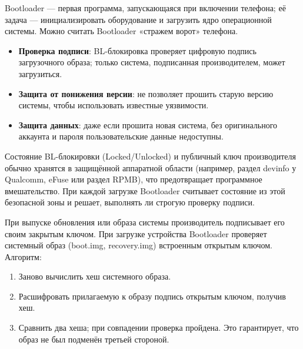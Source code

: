


Bootloader — первая программа, запускающаяся при включении телефона; её задача — инициализировать оборудование и загрузить ядро операционной системы. Можно считать Bootloader «стражем ворот» телефона.


\begin{itemize}
  \item \textbf{Проверка подписи}: BL-блокировка проверяет цифровую подпись загрузочного образа; только система, подписанная производителем, может загрузиться.
  \item \textbf{Защита от понижения версии}: не позволяет прошить старую версию системы, чтобы использовать известные уязвимости.
  \item \textbf{Защита данных}: даже если прошита новая система, без оригинального аккаунта и пароля пользовательские данные недоступны.
\end{itemize}


Состояние BL-блокировки (Locked/Unlocked) и публичный ключ производителя обычно хранятся в защищённой аппаратной области (например, раздел devinfo у Qualcomm, eFuse или раздел RPMB), что предотвращает программное вмешательство. При каждой загрузке Bootloader считывает состояние из этой безопасной зоны и решает, выполнять ли строгую проверку подписи.


При выпуске обновления или образа системы производитель подписывает его своим закрытым ключом. При загрузке устройства Bootloader проверяет системный образ (boot.img, recovery.img) встроенным открытым ключом. Алгоритм:

\begin{enumerate}
  \item Заново вычислить хеш системного образа.
  \item Расшифровать прилагаемую к образу подпись открытым ключом, получив хеш.
  \item Сравнить два хеша; при совпадении проверка пройдена. Это гарантирует, что образ не был подменён третьей стороной.
\end{enumerate}

